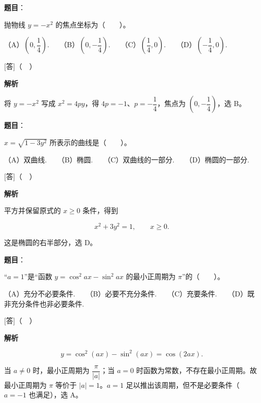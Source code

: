 \begin{answer}

\textbf{题目}：

抛物线 $y=-x^2$ 的焦点坐标为\mbox{（　　）}。

（A）$(0,\dfrac{1}{4})$.　　（B）$(0,-\dfrac{1}{4})$.　　（C）$(\dfrac{1}{4},0)$.　　（D）$(-\dfrac{1}{4},0)$.

[答]（　）

\textbf{解析}

将 $y=-x^2$ 写成 $x^2=4py$，得 $4p=-1$、$p=-\dfrac14$，焦点为 $(0,-\dfrac14)$，选 B。


\end{answer}
\begin{answer}

\textbf{题目}：

$x=\sqrt{1-3y^2}$ 所表示的曲线是\mbox{（　　）}。

（A）双曲线.　　（B）椭圆.　　（C）双曲线的一部分.　　（D）椭圆的一部分.

[答]（　）

\textbf{解析}

平方并保留原式的 $x\ge0$ 条件，得到

\nopagebreak[4]
\[
x^2+3y^2=1,\qquad x\ge0.
\]

这是椭圆的右半部分，选 D。


\end{answer}
\begin{answer}

\textbf{题目}：

“$a=1$”是“函数 $y=\cos^2 ax-\sin^2 ax$ 的最小正周期为 $\pi$”的\mbox{（　　）}。

（A）充分不必要条件.　　（B）必要不充分条件.　　（C）充要条件.　　（D）既非充分条件也非必要条件.

[答]（　）

\textbf{解析}

\nopagebreak[4]
\[
y=\cos^2(ax)-\sin^2(ax)=\cos(2ax).
\]

当 $a\ne0$ 时，最小正周期为 $\dfrac\pi{|a|}$；当 $a=0$ 时函数为常数，不存在最小正周期。故最小正周期为 $\pi$ 等价于 $|a|=1$。$a=1$ 足以推出该周期，但不是必要条件（$a=-1$ 也满足），选 A。


\end{answer}

